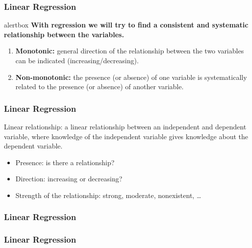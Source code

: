 \documentclass[aspectratio=169]{beamer}
\newcommand{\alertbox}[2][hgblue]{%
  \setbeamercolor{alertbox}{bg=#1,fg=white}
  \begin{beamercolorbox}[sep=2pt,center]{alertbox}
    \textbf{#2}
  \end{beamercolorbox}
}
\begin{document}
\begin{frame}
  \frametitle{Linear Regression}
  \alertbox{With \textcolor{hgyellow}{regression} we will try to find a \textcolor{hgyellow}{consistent} and \textcolor{hgyellow}{systematic} relationship between the variables.}
  
  
  \begin{enumerate}
    \item \textbf{Monotonic:} general direction of the relationship between the two variables can be indicated (increasing/decreasing).
    \item \textbf{Non-monotonic:}  the presence (or absence) of one variable is systematically related to the presence (or absence) of another variable.
  \end{enumerate}
\end{frame}

\begin{frame}
  \frametitle{Linear Regression}
  Linear relationship: a linear relationship between an independent and dependent variable, where knowledge of the independent variable gives knowledge about the dependent variable.
  \begin{itemize}
    \item Presence: is there a relationship?
    \item Direction: increasing or decreasing?
    \item Strength of the relationship: strong, moderate, nonexistent, \dots
  \end{itemize}
\end{frame}

\begin{frame}
  \frametitle{Linear Regression}
  \centering
\end{frame}

\begin{frame}
  \frametitle{Linear Regression}
  \centering
\end{frame}
\end{document}
